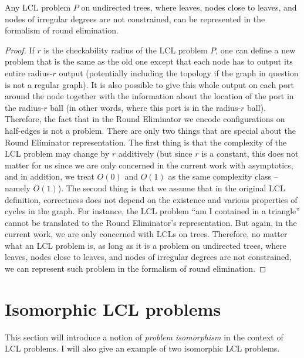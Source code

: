 \begin{theorem}\label{theorem:re_formalism_is_general}
Any LCL problem $P$ on undirected trees, where
leaves, nodes close to leaves, and nodes of irregular degrees are
not constrained, can be represented in the formalism of round elimination.
\end{theorem}
\begin{proof}
  If $r$ is the checkability radius of the LCL problem $P$,
  one can define a new problem that is the same as the old
  one except that each node has to output its entire radius-$r$
  output (potentially including the topology if the graph in
  question is not a regular graph). It is also possible to
  give this whole
  output on each port around the node together with
  the information about the location of the port in the
  radius-$r$ ball (in other words, where this port is in the radius-$r$
  ball). Therefore, the fact that in the Round Eliminator we encode configurations
  on half-edges is not a problem.
  There are only two things that are special about the Round Eliminator representation.
  The first thing is that the
  complexity of the LCL problem may change by $r$ additively
  (but since $r$ is a constant, this does not matter for us since we
  are only concerned in the current work with asymptotics, and in addition,
  we treat $O(0)$ and $O(1)$ as the same complexity class -- namely $O(1)$).
  The second thing is that
  we assume that in the original LCL definition,
  correctness does not depend on the existence and various properties
  of cycles in the graph. For instance, the LCL problem ``am I contained in a
  triangle'' cannot be translated to the Round Eliminator's representation.
  But again, in the current work,
  we are only concerned with LCLs on trees.
  Therefore, no matter what an LCL problem is, as long as it is a problem on
  undirected trees, where
  leaves, nodes close to leaves, and nodes of irregular degrees are
  not constrained, we can represent such problem in the formalism of
  round elimination.
\end{proof}

\section{Isomorphic LCL problems}

This section will introduce a notion of \emph{problem isomorphism}
in the context of LCL problems. I will also give an example
of two isomorphic LCL problems.

